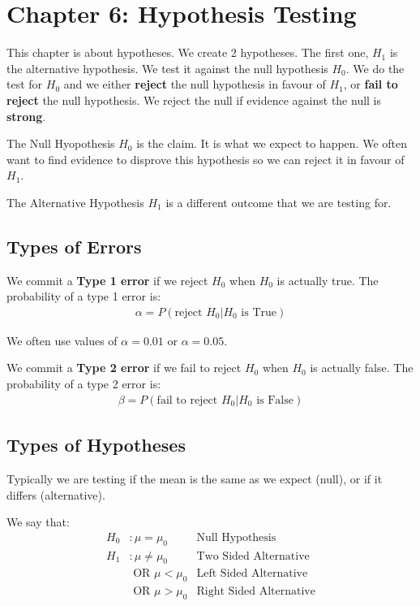 \documentclass[12pt,letterpaper]{article} \usepackage{amsmath} \usepackage{graphicx} \usepackage[margin=1in]{geometry} \usepackage{longtable}  \usepackage{amssymb}
\begin{document}
	\section{Chapter 6: Hypothesis Testing}
	This chapter is about hypotheses. We create 2 hypotheses. The first one, $H_1$ is the alternative hypothesis. We test it against the null hypothesis $H_0$. We do the test for $H_0$ and we either \textbf{reject} the null hypothesis in favour of $H_1$, or \textbf{fail to reject} the null hypothesis. We reject the null if evidence against the null is \textbf{strong}.
	
	The Null Hyopothesis $H_0$ is the claim. It is what we expect to happen. We often want to find evidence to disprove this hypothesis so we can reject it in favour of $H_1$.
	
	The Alternative Hypothesis $H_1$ is a different outcome that we are testing for. 
	
	\subsection{Types of Errors}
	
	We commit a \textbf{Type 1 error} if we reject $H_0$ when $H_0$ is actually true. The probability of a type 1 error is:
	\begin{align*}
		\alpha = P(\text{reject }H_0 | H_0\text{ is True})
	\end{align*}
	
	We often use values of $\alpha = 0.01$ or $\alpha = 0.05$.
	
	We commit a \textbf{Type 2 error} if we fail to reject $H_0$ when $H_0$ is actually false. The probability of a type 2 error is:
	\begin{align*}
		\beta= P(\text{fail to reject }H_0| H_0 \text{ is False})
	\end{align*}
	
	\subsection{Types of Hypotheses}
	Typically we are testing if the mean is the same as we expect (null), or if it differs (alternative).
	
	We say that:
	\begin{align*}
		H_0&: \mu = \mu_0 &\text{Null Hypothesis}\\
		H_1&: \mu \ne \mu_0 &\text{Two Sided Alternative}\\ 
		&\text{ OR } \mu<\mu_0 &\text{Left Sided Alternative}\\
		&\text{ OR } \mu>\mu_0 &\text{Right Sided Alternative}
	\end{align*}
	
\end{document}
